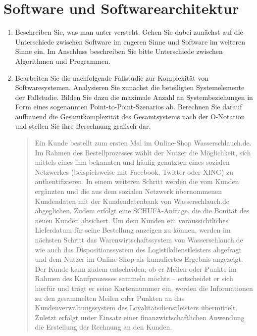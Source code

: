 \chapter{Software und Softwarearchitektur}
\label{ch:01_software-and-software-architecture}

\begin{universityTask}
    \begin{enumerate}[label=(\alph*)]
        \item Beschreiben Sie, was man unter  versteht. Gehen Sie dabei zunächst auf die Unterschiede zwischen Software im engeren Sinne und Software im weiteren Sinne ein. Im Anschluss beschreiben Sie bitte Unterschiede zwischen Algorithmen und Programmen.
        \item Bearbeiten Sie die nachfolgende Fallstudie zur Komplexität von Softwaresystemen. Analysieren Sie zunächst die beteiligten Systemelemente der Fallstudie. Bilden Sie dazu die maximale Anzahl an Systembeziehungen in Form eines sogenannten Point-to-Point-Szenarios ab. Berechnen Sie darauf aufbauend die Gesamtkomplexität des Gesamtsystems nach der O-Notation und stellen Sie ihre Berechnung grafisch dar. \linebreak
            \begin{quotation}
                \begin{itshape}
                    Ein Kunde bestellt zum ersten Mal im Online-Shop Wasserschlauch.de. Im Rahmen des Bestellprozesses wählt der Nutzer die Möglichkeit, sich mittels eines ihm bekannten und häufig genutzten  eines sozialen Netzwerkes (beispielsweise mit Facebook, Twitter oder XING) zu authentifizieren. In einem weiteren Schritt werden die vom Kunden ergänzten und die aus dem sozialen Netzwerk übernommenen Kundendaten mit der Kundendatenbank von Wasserschlauch.de abgeglichen. Zudem erfolgt eine SCHUFA-Anfrage, die die Bonität des neuen Kunden absichert. Um dem Kunden ein voraussichtliches Lieferdatum für seine Bestellung anzeigen zu können, werden im nächsten Schritt das Warenwirtschaftssystem von Wasserschlauch.de wie auch das Dispositionssystem des Logistikdienstleisters abgefragt und dem Nutzer im Online-Shop als kumuliertes Ergebnis angezeigt. Der Kunde kann zudem entscheiden, ob er Meilen oder Punkte im Rahmen des Kaufprozesses sammeln möchte -- entscheidet er sich hierfür und trägt er seine Kartennummer ein, werden die Informationen zu den gesammelten Meilen oder Punkten an das Kundenverwaltungssystem des Loyalitätsdienstleisters übermittelt. Zuletzt erfolgt unter Einsatz einer finanzwirtschaftlichen Anwendung die Erstellung der Rechnung an den Kunden.

\end{itshape}
\end{quotation}
\end{enumerate}
\end{universityTask}
